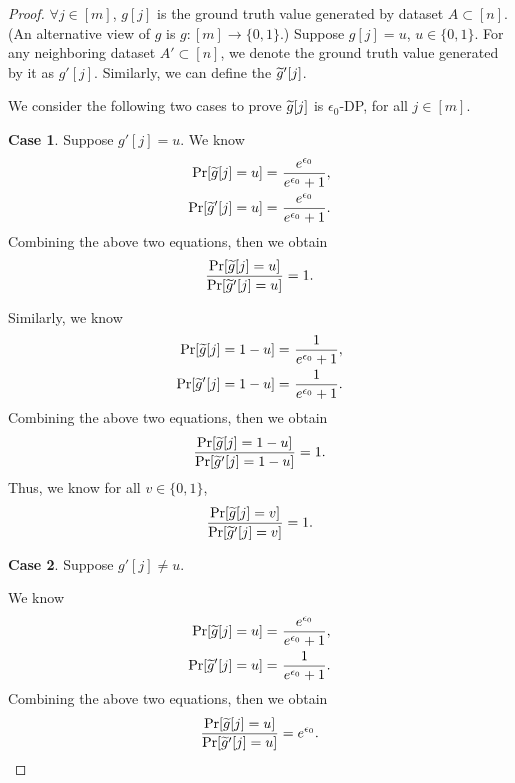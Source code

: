 \begin{proof}

$\forall j \in [m]$, $g[j]$ is the ground truth value generated by dataset $A \subset [n]$. (An alternative view of $g$ is $g:[m] \rightarrow \{0,1\}$.) Suppose $g[j] = u$, $u \in \{0, 1\}$. For any neighboring dataset $A' \subset [n]$, we denote the ground truth value generated by it as $g'[j]$. Similarly, we can define the $\widetilde{g}'[j]$. 

We consider the following two cases to prove $\widetilde{g}[j]$ is $\epsilon_0$-DP, for all $j \in [m]$.

{\bf Case 1}. Suppose $g'[j] = u$. We know
\begin{align*}
    \Pr [ \widetilde{g}[j] = u ] = & ~ \frac{e^{\epsilon_0}}{ e^{\epsilon_0} + 1 }, \\
    \Pr[ \widetilde{g}'[j] = u ] = & ~ \frac{e^{\epsilon_0}}{ e^{\epsilon_0} + 1 }.
\end{align*}
Combining the above two equations, then we obtain
\begin{align*}
\frac{ \Pr [ \widetilde{g}[j] = u ] }{ \Pr[ \widetilde{g}'[j] = u ] } = 1.
\end{align*}

Similarly, we know 
\begin{align*}
    \Pr [ \widetilde{g}[j] = 1-u ] = & ~ \frac{ 1 }{ e^{\epsilon_0} + 1 }, \\
    \Pr[ \widetilde{g}'[j] = 1-u ] = & ~ \frac{ 1 }{ e^{\epsilon_0} + 1 }.
\end{align*}
Combining the above two equations, then we obtain
\begin{align*}
\frac{ \Pr [ \widetilde{g}[j] = 1- u ] }{ \Pr[ \widetilde{g}'[j] = 1-u ] } = 1.
\end{align*}
Thus, we know for all $v\in \{0,1\}$,
\begin{align*}
\frac{ \Pr [ \widetilde{g}[j] = v ] }{ \Pr[ \widetilde{g}'[j] = v ] } = 1.
\end{align*}

{\bf Case 2}. Suppose $g'[j] \neq u$.

We know
\begin{align*}
    \Pr [ \widetilde{g}[j] = u ] = & ~ \frac{e^{\epsilon_0}}{ e^{\epsilon_0} + 1 }, \\
    \Pr[ \widetilde{g}'[j] = u ] = & ~ \frac{ 1 }{ e^{\epsilon_0} + 1 }.
\end{align*}
Combining the above two equations, then we obtain
\begin{align*}
\frac{ \Pr [ \widetilde{g}[j] = u ] }{ \Pr[ \widetilde{g}'[j] = u ] } = e^{\epsilon_0}.
\end{align*}


\end{proof}
